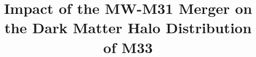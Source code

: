 \documentclass[twocolumn, linenumbers,trackchanges]{aastex7}
\begin{document}
\title{Impact of the MW-M31 Merger on the Dark Matter Halo Distribution of M33}

\end{document}
